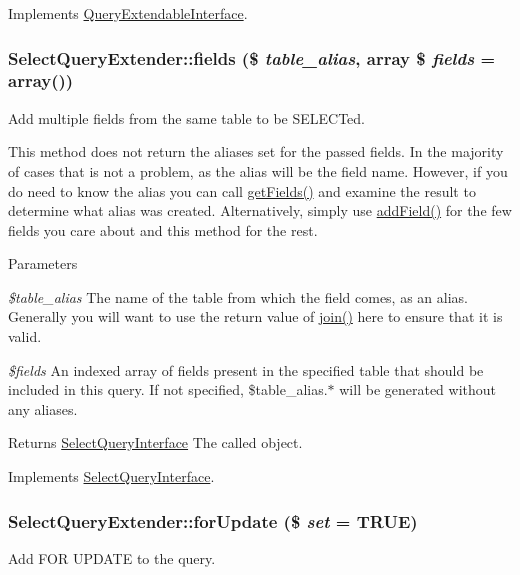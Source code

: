 Implements \hyperlink{interfaceQueryExtendableInterface_a247fadddaaecd7806d493ba85c388e65}{QueryExtendableInterface}.\hypertarget{classSelectQueryExtender_a5b4e0bd5f5e383054a8580dd4fbac077}{
\subsubsection[{fields}]{\setlength{\rightskip}{0pt plus 5cm}SelectQueryExtender::fields (\$ {\em table\_\-alias}, \/  array \$ {\em fields} = {\ttfamily array()})}}
\label{classSelectQueryExtender_a5b4e0bd5f5e383054a8580dd4fbac077}
Add multiple fields from the same table to be SELECTed.

This method does not return the aliases set for the passed fields. In the majority of cases that is not a problem, as the alias will be the field name. However, if you do need to know the alias you can call \hyperlink{classSelectQueryExtender_a112da9c917a0e87bba6a8452e29fb8f9}{getFields()} and examine the result to determine what alias was created. Alternatively, simply use \hyperlink{classSelectQueryExtender_ab5d7e784fcc0f74caa07a53ddc423f05}{addField()} for the few fields you care about and this method for the rest.


\begin{DoxyParams}{Parameters}
\item[{\em \$table\_\-alias}]The name of the table from which the field comes, as an alias. Generally you will want to use the return value of \hyperlink{classSelectQueryExtender_a6b9998d4e438ab3edc2867e32a5c120c}{join()} here to ensure that it is valid. \item[{\em \$fields}]An indexed array of fields present in the specified table that should be included in this query. If not specified, \$table\_\-alias.$\ast$ will be generated without any aliases. \end{DoxyParams}
\begin{DoxyReturn}{Returns}
\hyperlink{interfaceSelectQueryInterface}{SelectQueryInterface} The called object. 
\end{DoxyReturn}


Implements \hyperlink{interfaceSelectQueryInterface_a7e5fcf83e82fe4f5b97d60bfccf2bb7f}{SelectQueryInterface}.\hypertarget{classSelectQueryExtender_a90e930c3ee67a055b81f7f31b18ba84e}{
\subsubsection[{forUpdate}]{\setlength{\rightskip}{0pt plus 5cm}SelectQueryExtender::forUpdate (\$ {\em set} = {\ttfamily TRUE})}}
\label{classSelectQueryExtender_a90e930c3ee67a055b81f7f31b18ba84e}
Add FOR UPDATE to the query.

